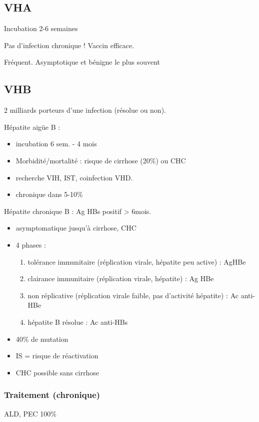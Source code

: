 \documentclass[11pt]{article}
\begin{document}
\subsection{VHA}
\label{sec:org2d6b308}
Incubation 2-6 semaines

Pas d'infection chronique !
Vaccin efficace.

Fréquent. Asymptotique et bénigne le plus souvent

\subsection{VHB}
\label{sec:org1948ad3}
2 milliards porteurs d'une infection (résolue ou non). 

Hépatite aigüe B :
\begin{itemize}
\item incubation 6 sem. - 4 mois
\item Morbidité/mortalité : risque de cirrhose (20\%) ou \gls{CHC}
\item \danger recherche VIH, IST, coinfection VHD.
\item chronique dans 5-10\%
\end{itemize}

Hépatite chronique B : Ag HBs positif > 6mois. 
\begin{itemize}
\item asymptomatique jusqu'à cirrhose, CHC
\item 4 phases :
\begin{enumerate}
\item tolérance immunitaire (réplication virale, hépatite peu active) : AgHBe
\item clairance immunitaire (réplication virale, hépatite) : Ag HBe
\item non réplicative (réplication virale faible, pas d'activité hépatite) : Ac
anti-HBe
\item hépatite B résolue : Ac anti-HBs
\end{enumerate}
\item 40\% de mutation
\item \gls{IS} = risque de réactivation \faBomb
\item CHC possible sans cirrhose \danger
\end{itemize}

\subsubsection{Traitement (chronique)}
\label{sec:orge24f5a4}
ALD, PEC 100\%
\end{document}
